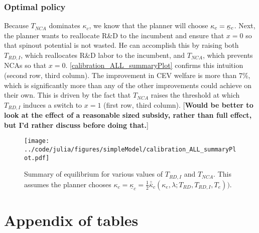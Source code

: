\documentclass[11pt,english]{article}
\newcommand\munderbar[1]{%
	\underaccent{\bar}{#1}}
\theoremstyle{remark}
\begin{document}
\subsubsection{Optimal policy}

Because $T_{NCA}$ dominates $\kappa_c$, we know that the planner will choose $\kappa_c = \munderbar{\kappa}_c$. Next, the planner wants to reallocate R\&D to the incumbent and ensure that $x = 0$ so that spinout potential is not wasted. He can accomplish this by raising both $T_{RD,I}$, which reallocates R\&D labor to the incumbent, and $T_{NCA}$, which prevents NCAs so that $x = 0$. \autoref{calibration_ALL_summaryPlot} confirms this intuition (second row, third column). The improvement in CEV welfare is more than 7\%, which is significantly more than any of the other improvements could achieve on their own. This is driven by the fact that $T_{NCA}$ raises the threshold at which $T_{RD,I}$ induces a switch to $x = 1$ (first row, third column). [\textbf{Would be better to look at the effect of a reasonable sized subsidy, rather than full effect, but I'd rather discuss before doing that.}] 

\begin{figure}[]
	\texttt{[image: ../code/julia/figures/simpleModel/calibration\_ALL\_summaryPlot.pdf]}
	\caption{Summary of equilibrium for various values of $T_{RD,I}$ and $T_{NCA}$. This assumes the planner chooses $\kappa_c = \underline{\kappa}_c = \frac{1}{2} \bar{\bar{\kappa}}_c(\kappa_e,\lambda;T_{RD},T_{RD,I},T_e))$.}
	\label{calibration_ALL_summaryPlot}
\end{figure}



\appendix

\section{Appendix of tables}




\end{document}
